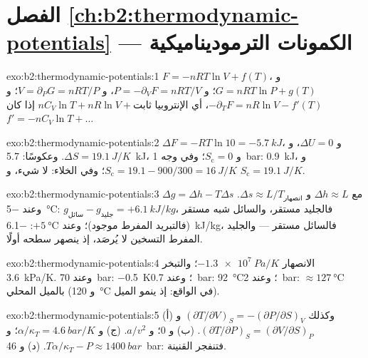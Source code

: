 \section*{الفصل \ref{ch:b2:thermodynamic-potentials} --- الكمونات الترموديناميكية}

\begin{solution}{exo:b2:thermodynamic-potentials:1}
$F = -nRT\ln V + f(T)$، و $G = nRT\ln P + g(T)$؛ و $P = -\partial_VF = nRT/V$،
و $V = \partial_PG = nRT/P$؛ و $-\partial_TF = nR\ln V - f'(T)$، أي الإنتروبيا
$nC_V\ln T + nR\ln V + \text{ثابت}$ إذا كان $f' = -nC_V\ln T + \dots$
\end{solution}

\begin{solution}{exo:b2:thermodynamic-potentials:2}
$\Delta F = -RT\ln 10 = \qty{-5.7}{kJ}$، و $\Delta U = 0$، و $\Delta S = \qty{19.1}{J/K}$.
وعكوسًا: \qty{5.7}{kJ}، و $S_{\text{c}} = 0$؛ وفي وجه \qty{1}{bar}: \qty{0.9}{kJ}،
و $S_{\text{c}} = 19.1 - 900/300 = \qty{16}{J/K}$؛ وفي الخلاء: لا شيء، و $S_{\text{c}} =
\qty{19.1}{J/K}$.
\end{solution}

\begin{solution}{exo:b2:thermodynamic-potentials:3}
$\Delta g = \Delta h - T\Delta s$ مع $\Delta h \approx L$ و $\Delta s \approx L/T_{\text{انصهار}}$.
وعند \qty{-5}{\celsius}: $g_{\text{سائل}} - g_{\text{جليد}} = +\qty{6.1}{kJ/kg}$، فالجليد
مستقر، والسائل شبه مستقر (فالتبريد المفرط موجود)؛ وعند $+\qty{5}{\celsius}$:
\qty{-6.1}{kJ/kg}، فالسائل مستقر --- والجليد المفرط التسخين لا يُرصَد، إذ
ينصهر سطحه أولًا.
\end{solution}

\begin{solution}{exo:b2:thermodynamic-potentials:4}
الانصهار $\qty{-1.3e7}{Pa/K}$؛ والتبخر \qty{3.6}{kPa/K}. وعند \qty{70}{bar}:
\qty{-0.5}{K}؛ وعند \qty{0.7}{bar}: \qty{92}{\celsius}؛ وعند \qty{2}{bar}: $\approx
\qty{127}{\celsius}$ بالميل المحلي (و \qty{120}{\celsius} في الواقع: إذ
ينمو الميل).
\end{solution}

\begin{solution}{exo:b2:thermodynamic-potentials:5}
(أ) وكذلك $(\partial T/\partial V)_S = -(\partial P/\partial S)_V$ و
$(\partial T/\partial P)_S = (\partial V/\partial S)_P$. (ب) و $0$؛ و $a/v^2$. (ج)
و $\alpha/\kappa_T = \qty{4.6}{bar/K}$؛ و $T\alpha/\kappa_T - P \approx \qty{1400}{bar}$.
(د) و \qty{46}{bar}: فتنفجر القنينة.
\end{solution}

